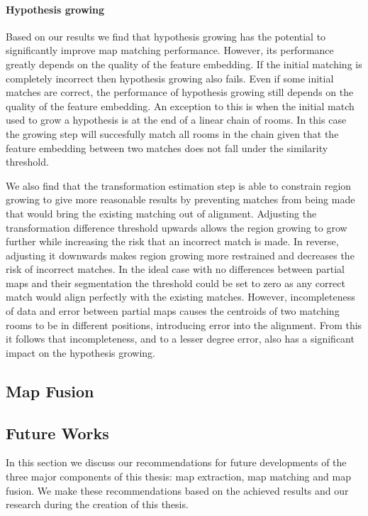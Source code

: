 \paragraph{Hypothesis growing}
Based on our results we find that hypothesis growing has the potential to significantly improve map matching performance. However, its performance greatly depends on the quality of the feature embedding. If the initial matching is completely incorrect then hypothesis growing also fails. Even if some initial matches are correct, the performance of hypothesis growing still depends on the quality of the feature embedding. An exception to this is when the initial match used to grow a hypothesis is at the end of a linear chain of rooms. In this case the growing step will succesfully match all rooms in the chain given that the feature embedding between two matches does not fall under the similarity threshold. 

We also find that the transformation estimation step is able to constrain region growing to give more reasonable results by preventing matches from being made that would bring the existing matching out of alignment. Adjusting the transformation difference threshold upwards allows the region growing to grow further while increasing the risk that an incorrect match is made. In reverse, adjusting it downwards makes region growing more restrained and decreases the risk of incorrect matches. In the ideal case with no differences between partial maps and their segmentation the threshold could be set to zero as any correct match would align perfectly with the existing matches. However, incompleteness of data and error between partial maps causes the centroids of two matching rooms to be in different positions, introducing error into the alignment. From this it follows that incompleteness, and to a lesser degree error, also has a significant impact on the hypothesis growing.


\subsection{Map Fusion}



\subsection{Future Works}
In this section we discuss our recommendations for future developments of the three major components of this thesis: map extraction, map matching and map fusion. We make these recommendations based on the achieved results and our research during the creation of this thesis. 

